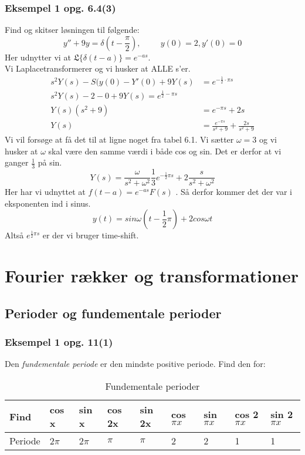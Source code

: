 \documentclass[11pt,fleqn]{book} %
\begin{document}
\subsection{Eksempel 1 opg. 6.4(3)}
Find og skitser løsningen til følgende:
\begin{equation}
y''+9y= \delta (t- \frac{\pi}{2}) , \hspace{1cm} y(0) =2, y'(0)=0
\end{equation}
Her udnytter vi at $ \mathfrak{L} \{  \delta (t-a)\}=e^{-as}$.\\
Vi Laplacetransformerer og vi husker at ALLE s'er.
\begin{equation}
\begin{split}
s^2Y(s)-S(y(0)-Y'(0)+9Y(s) & =e^{-\frac{1}{2} \cdot \pi s}\\
s^2Y(s)-2-0+9Y(s)=e^{\frac{1}{2}-\pi s}\\
Y(s)(s^2+9) &=e^{-\pi s}+2s \\
Y(s) &=\frac{e^{-\pi s}}{s^2+9}+\frac{2s}{s^2+9}
\end{split}
\end{equation}
Vi vil forsøge at få det til at ligne noget fra tabel 6.1. Vi sætter $\omega=3$ og vi husker at $\omega$ skal være den samme værdi i både cos og sin. Det er derfor at vi ganger $\frac{1}{3}$ på sin.
\begin{equation}
Y(s)=\frac{\omega}{s^2+\omega^2}\frac{1}{3}e^{-\frac{1}{2}\pi s}+ 2\frac{s}{s^2+ \omega^2}
\end{equation}
Her har vi udnyttet at $f(t-a)=e^{-as}F(s)$ . Så derfor kommer det der var i eksponenten ind i sinus.
\begin{equation}
y(t)=sin\omega (t- \frac{1}{2} \pi)+2cos \omega t
\end{equation}
Altså $e^{\frac{1}{2} \pi s}$ er der vi bruger time-shift.


\chapter{Fourier rækker og transformationer}
\section{Perioder og fundementale perioder}

\subsection{Eksempel 1 opg. 11(1)}
Den \textit{fundementale periode} er den mindste positive periode. Find den for:\\
\begin{table}[hts!]
\centering
\caption{Fundementale perioder}
\label{adadads}
\begin{tabular}{|l|l|l|l|l|l|l|l|l|}
\hline
Find    & cos x  & sin x  & cos 2x & sin 2x & cos $\pi x$ & sin $\pi x$ & cos 2$\pi x$ & sin 2$\pi x$ \\ \hline
Periode & 2$\pi$ & 2$\pi$ & $\pi$  & $\pi$  & 2           & 2           & 1            & 1            \\ \hline
\end{tabular}
\end{table}
\end{document}
